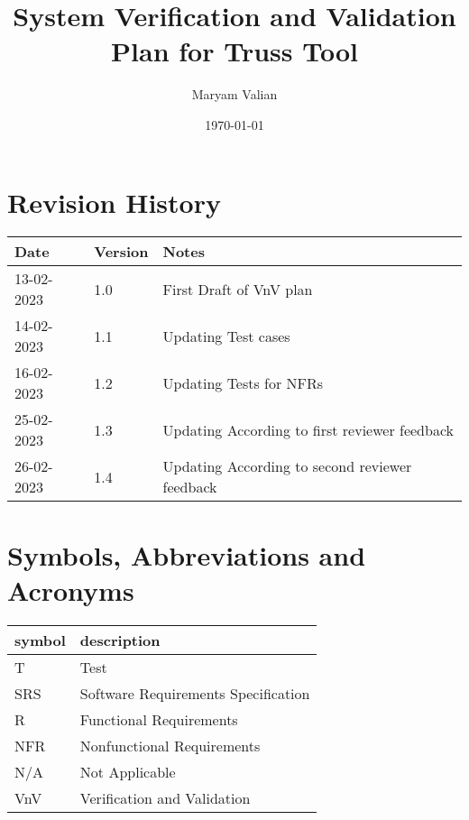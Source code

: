 \documentclass[12pt, titlepage]{article}
\begin{document}
\title{ System Verification and Validation Plan for Truss Tool} 
\author{Maryam Valian}
\date{\today}
	
\maketitle


\section{Revision History}

\begin{tabularx}{\textwidth}{p{3cm}p{2cm}X}
\toprule {\bf Date} & {\bf Version} & {\bf Notes}\\
\midrule
13-02-2023 & 1.0 & First Draft of VnV plan\\
14-02-2023 & 1.1& Updating Test cases   \\
16-02-2023 & 1.2& Updating Tests for NFRs   \\
25-02-2023 & 1.3& Updating According to first reviewer feedback   \\
26-02-2023 & 1.4& Updating According to second reviewer feedback   \\


\bottomrule
\end{tabularx}

\newpage

\tableofcontents

\newpage

\section{Symbols, Abbreviations and Acronyms}

\renewcommand{\arraystretch}{1.2}
\begin{tabular}{l l} 
  \toprule		
  \textbf{symbol} & \textbf{description}\\
  \midrule 
  T & Test\\
  SRS & Software Requirements Specification\\
  R & Functional Requirements\\
  NFR & Nonfunctional Requirements\\
  N/A & Not Applicable\\
  VnV & Verification and Validation\\
  
\bottomrule
\end{tabular}\\
\end{document}
